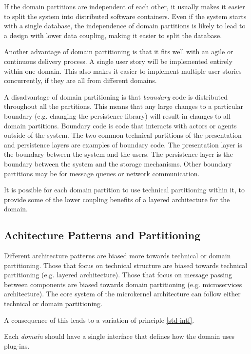 If the domain partitions are independent of each other, it usually makes it easier to split the system into distributed software containers.
Even if the system starts with a single database, the independence of domain partitions is likely to lead to a design with lower data coupling,
making it easier to split the database.

Another advantage of domain partitioning is that it fits well with an agile or continuous delivery process.
A single user story will be implemented entirely within one domain.
This also makes it easier to implement multiple user stories concurrently, if they are all from different domains.

A disadvantage of domain partitioning is that \emph{boundary} code is distributed throughout all the partitions.
This means that any large changes to a particular boundary (e.g. changing the persistence library) will result in changes to all domain partitions.
Boundary code is code that interacts with actors or agents outside of the system.
The two common technical partitions of the presentation and persistence layers are examples of boundary code.
The presentation layer is the boundary between the system and the users.
The persistence layer is the boundary between the system and the storage mechanisms.
Other boundary partitions may be for message queues or network communication.

It is possible for each domain partition to use technical partitioning within it,
to provide some of the lower coupling benefits of a layered architecture for the domain.

\subsection{Achitecture Patterns and Partitioning}
Different architecture patterns are biased more towards technical or domain partitioning.
Those that focus on technical structure are biased towards technical partitioning (e.g. layered architecture).
Those that focus on message passing between components are biased towards domain partitioning (e.g. microservices architecture).
The core system of the microkernel architecture can follow either technical or domain partitioning.

A consequence of this leads to a variation of principle \ref{std-intf}.

\vspace{1mm}
\begin{definition}\label{domain-intf}
    Each \emph{domain} should have a single interface that defines how the domain uses plug-ins.
\end{definition}

